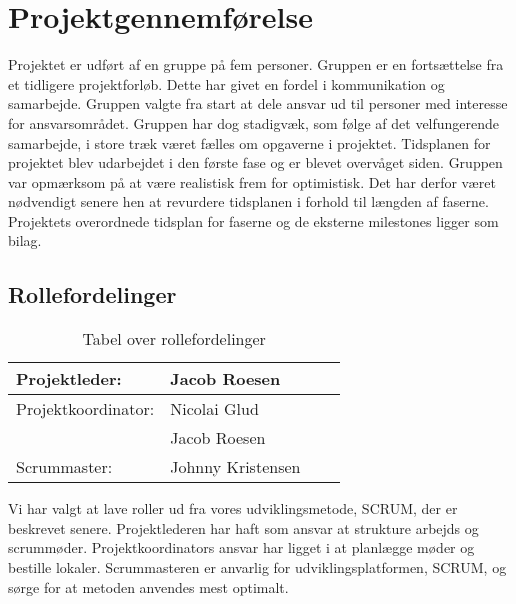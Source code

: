 \section{Projektgennemførelse}
Projektet er udført af en gruppe på fem personer. Gruppen er en fortsættelse fra et tidligere projektforløb. Dette har givet en fordel i kommunikation og samarbejde. Gruppen valgte fra start at dele ansvar ud til personer med interesse for ansvarsområdet. Gruppen har dog stadigvæk, som følge af det velfungerende samarbejde, i store træk været fælles om opgaverne i projektet.
Tidsplanen for projektet blev udarbejdet i den første fase og er blevet overvåget siden. Gruppen var opmærksom på at være realistisk frem for optimistisk. Det har derfor været nødvendigt senere hen at revurdere tidsplanen i forhold til længden af faserne.
Projektets overordnede tidsplan for faserne og de eksterne milestones ligger som bilag.
\subsection{Rollefordelinger}
\begin{table}[H]
\begin{tabular}{|p{3cm}|p{3cm}|p{3cm}|p{4.5cm}|} \hline
Projektleder: &Jacob Roesen\\\hline
Projektkoordinator: &Nicolai Glud\\
	&Jacob Roesen\\
Scrummaster: &Johnny Kristensen
\end{tabular}
\caption{Tabel over rollefordelinger}
\label{table:roller}
\end{table}
Vi har valgt at lave roller ud fra vores udviklingsmetode, SCRUM, der er beskrevet senere. Projektlederen har haft som ansvar at strukture arbejds og scrummøder. Projektkoordinators ansvar har ligget i at planlægge møder og bestille lokaler. Scrummasteren er anvarlig for udviklingsplatformen, SCRUM, og sørge for at metoden anvendes mest optimalt. 